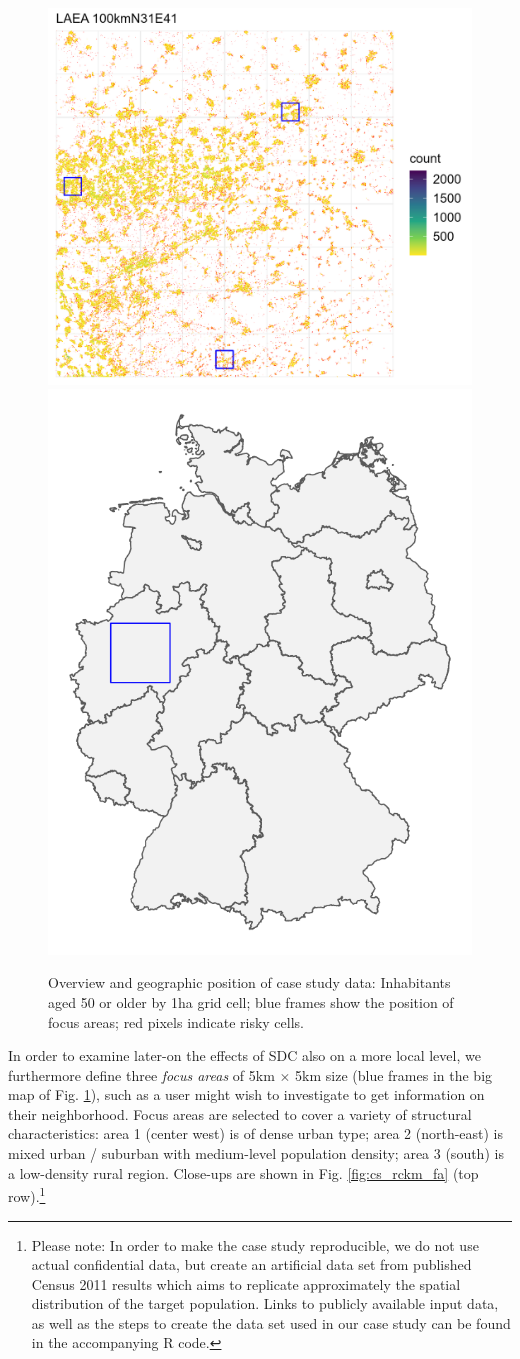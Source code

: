 \begin{figure}[H]
    \centering
    \includegraphics[width = 0.77\linewidth]{figures/CaseStudy_CKM/laea_100kmn31e41_cs.png}
    \includegraphics[width = 0.22\linewidth]{figures/CaseStudy_CKM/region_select_cs.png}
    \caption{Overview and geographic position of case study data: Inhabitants aged 50 or older by 1ha grid cell; blue frames show the position of focus areas; red pixels indicate risky cells.}
    \label{fig:cs_data}
\end{figure}

In order to examine later-on the effects of SDC also on a more local level, we furthermore define three \emph{focus areas} of 5km $\times$ 5km size (blue frames in the big map of Fig. \ref{fig:cs_data}), such as a user might wish to investigate to get information on their neighborhood.
Focus areas are selected to cover a variety of structural characteristics: area 1 (center west) is of dense urban type; area 2 (north-east) is mixed urban / suburban with medium-level population density; area 3 (south) is a low-density rural region. Close-ups are shown in Fig. \ref{fig:cs_rckm_fa} (top row).\footnote{
    Please note: In order to make the case study reproducible, we do not use actual confidential data, but create an artificial data set from published Census 2011 results which aims to replicate approximately the spatial distribution of the target population. Links to publicly available input data, as well as the steps to create the data set used in our case study can be found in the accompanying R code.}

